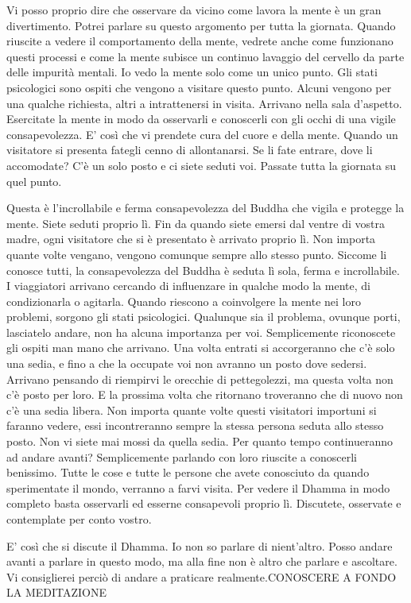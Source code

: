 Vi posso proprio dire che osservare da vicino come lavora la mente è un
gran divertimento. Potrei parlare su questo argomento per tutta la
giornata. Quando riuscite a vedere il comportamento della mente, vedrete
anche come funzionano questi processi e come la mente subisce un
continuo lavaggio del cervello da parte delle impurità mentali. Io vedo
la mente solo come un unico punto. Gli stati psicologici sono ospiti che
vengono a visitare questo punto. Alcuni vengono per una qualche
richiesta, altri a intrattenersi in visita. Arrivano nella sala
d'aspetto. Esercitate la mente in modo da osservarli e conoscerli con
gli occhi di una vigile consapevolezza. E' così che vi prendete cura del
cuore e della mente. Quando un visitatore si presenta fategli cenno di
allontanarsi. Se li fate entrare, dove li accomodate? C'è un solo posto
e ci siete seduti voi. Passate tutta la giornata su quel punto.

Questa è l'incrollabile e ferma consapevolezza del Buddha che vigila e
protegge la mente. Siete seduti proprio lì. Fin da quando siete emersi
dal ventre di vostra madre, ogni visitatore che si è presentato è
arrivato proprio lì. Non importa quante volte vengano, vengono comunque
sempre allo stesso punto. Siccome li conosce tutti, la consapevolezza
del Buddha è seduta lì sola, ferma e incrollabile. I viaggiatori
arrivano cercando di influenzare in qualche modo la mente, di
condizionarla o agitarla. Quando riescono a coinvolgere la mente nei
loro problemi, sorgono gli stati psicologici. Qualunque sia il problema,
ovunque porti, lasciatelo andare, non ha alcuna importanza per voi.
Semplicemente riconoscete gli ospiti man mano che arrivano. Una volta
entrati si accorgeranno che c'è solo una sedia, e fino a che la occupate
voi non avranno un posto dove sedersi. Arrivano pensando di riempirvi le
orecchie di pettegolezzi, ma questa volta non c'è posto per loro. E la
prossima volta che ritornano troveranno che di nuovo non c'è una sedia
libera. Non importa quante volte questi visitatori importuni si faranno
vedere, essi incontreranno sempre la stessa persona seduta allo stesso
posto. Non vi siete mai mossi da quella sedia. Per quanto tempo
continueranno ad andare avanti? Semplicemente parlando con loro riuscite
a conoscerli benissimo. Tutte le cose e tutte le persone che avete
conosciuto da quando sperimentate il mondo, verranno a farvi visita. Per
vedere il Dhamma in modo completo basta osservarli ed esserne
consapevoli proprio lì. Discutete, osservate e contemplate per conto
vostro.

E' così che si discute il Dhamma. Io non so parlare di nient'altro.
Posso andare avanti a parlare in questo modo, ma alla fine non è altro
che parlare e ascoltare. Vi consiglierei perciò di andare a praticare
realmente.CONOSCERE A FONDO LA MEDITAZIONE

